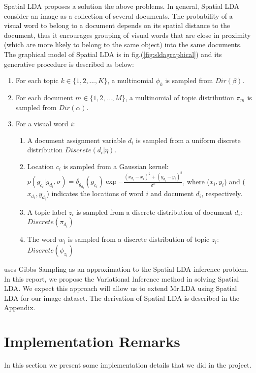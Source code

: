 \documentclass{acm_proc_article-sp}
\begin{document}
Spatial LDA proposes a solution the above problems. In general, Spatial LDA consider an image as a collection of several documents. The probability of a visual word to belong to a document depends on its spatial distance to the document, thus it encourages grouping of visual words that are close in proximity (which are more likely to belong to the same object) into the same documents. The graphical model of Spatial LDA is in fig.(\ref{fig:sldagraphical}) and its generative procedure is described as below:

\begin{enumerate}
\item For each topic $k \in \{1,2,...,K\}$, a multinomial $\phi_k$ is sampled from $Dir(\beta)$.
\item For each document $m \in \{1,2,...,M\}$, a multinomial of topic distribution $\pi_m$ is sampled from $Dir(\alpha)$.
\item For a visual word $i$:
	\begin{enumerate}
		\item A document assignment variable $d_i$ is sampled from a uniform discrete distribution $Discrete(d_i|\eta)$.
		\item Location $c_i$ is sampled from a Gaussian kernel: $p(g_{c_i} | g_{d_i}, \sigma) = \delta_{g_{d_i}}(g_{c_i}) \exp{-\frac{(x_{d_i} - x_i)^2 + (y_{d_i} - y_i)^2} {\sigma^2}}$, where ($x_i, y_i$) and ($x_{d_i}, y_{d_i}$) indicates the locations of word $i$ and document $d_i$, respectively.
		\item A topic label $z_{i}$ is sampled from a discrete distribution of document $d_i$:  $Discrete(\pi_{d_i})$
		\item The word $w_i$ is sampled from a discrete distribution of topic $z_{i}$: $Discrete(\phi_{z_i})$ 
	\end{enumerate}
\end{enumerate}

\cite{DBLP:conf/nips/WangG07} uses Gibbs Sampling as an approximation to the Spatial LDA inference problem. In this report, we propose the Variational Inference method in solving Spatial LDA. We expect this approach will allow us to extend Mr.LDA using Spatial LDA for our image dataset. The derivation of Spatial LDA is described in the Appendix.

\section{Implementation Remarks}\label{sec:impl}
In this section we present some implementation details that we did in the project.
\end{document}
